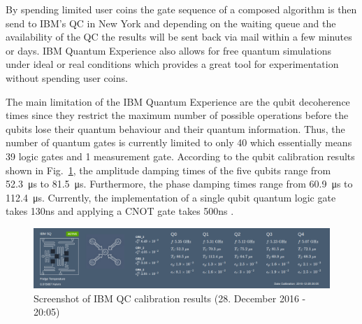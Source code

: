 By spending limited user coins the gate sequence of a composed algorithm is then send to IBM's QC in New York and depending on the waiting queue and the availability of the QC the results will be sent back via mail within a few minutes or days. IBM Quantum Experience also allows for free quantum simulations under ideal or real conditions which provides a great tool for experimentation without spending user coins.

The main limitation of the IBM Quantum Experience are the qubit decoherence times since they restrict the maximum number of possible operations before the qubits lose their quantum behaviour and their quantum information. Thus, the number of quantum gates is currently limited to only 40 which essentially means 39 logic gates and 1 measurement gate. According to the qubit calibration results shown in Fig.~\ref{fig:calibration}, the amplitude damping times of the five qubits range from \SI{52.3}{\micro\second} to \SI{81.5}{\micro\second}. Furthermore, the phase damping times range from \SI{60.9}{\micro\second} to \SI{112.4}{\micro\second}. Currently, the implementation of a single qubit quantum logic gate takes 130ns and applying a CNOT gate takes 500ns \cite{ibmgatetimes}.

\begin{figure}[H]
      \centering
       \includegraphics[scale=0.33]{img/ibmcalibration.png}
       \caption{\label{fig:calibration} Screenshot of IBM QC calibration results (28. December 2016 - 20:05)}
\end{figure}
